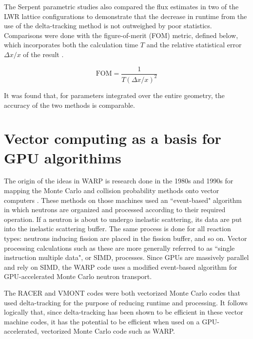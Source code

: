 The Serpent parametric studies also compared the flux estimates in two of the LWR lattice configurations 
to demonstrate that the decrease in runtime from the use of the delta-tracking method is not outweighed by
poor statistics. Comparisons were done with the figure-of-merit (FOM) metric, defined below, which 
incorporates both the calculation time $T$ and the relative statistical error $\Delta x/x$ of the result 
\cite{serp_delta}. 

\begin{equation}
\label{fom}
\text{FOM} = \frac{1}{T(\Delta x/x)^2}
\end{equation}

It was found that, for parameters integrated over the entire geometry, the accuracy of the two methods is 
comparable.

\section{Vector computing as a basis for GPU algorithims}

The origin of the ideas in WARP is research done in the 1980s and 1990s for mapping the Monte Carlo and 
collision probability methods onto vector computers \cite{warp2015}. These methods on those machines used 
an ``event-based" algorithm in which neutrons are organized and processed according to their required 
operation. If a neutron is about to undergo inelastic scattering, its data are put into the inelastic 
scattering buffer. The same process is done for all reaction types: neutrons inducing fission are placed 
in the fission buffer, and so on. Vector processing calculations such as these are more generally referred
to as ``single instruction multiple data", or SIMD, processes. Since GPUs are massively parallel and rely 
on SIMD, the WARP code uses a modified event-based algorithm for GPU-accelerated Monte Carlo neutron 
transport.

The RACER and VMONT codes were both vectorized Monte Carlo codes that used delta-tracking for the purpose 
of reducing runtime and processing. It follows logically that, since delta-tracking has been shown to be 
efficient in these vector machine codes, it has the potential to be efficient when used on a 
GPU-accelerated, vectorized Monte Carlo code such as WARP.

